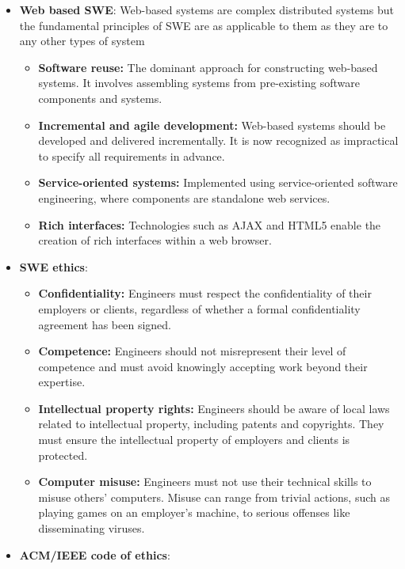 \documentclass{report}
\begin{document}
\begin{itemize}
        \item \textbf{Web based SWE}: Web-based systems are complex distributed systems but the fundamental principles of SWE are as applicable to them as they are to any other types of system
            \begin{itemize}[noitemsep]
                \item \textbf{Software reuse:} The dominant approach for constructing web-based systems. It involves assembling systems from pre-existing software components and systems.
                \item \textbf{Incremental and agile development:} Web-based systems should be developed and delivered incrementally. It is now recognized as impractical to specify all requirements in advance.
                \item \textbf{Service-oriented systems:} Implemented using service-oriented software engineering, where components are standalone web services.
                \item \textbf{Rich interfaces:} Technologies such as AJAX and HTML5 enable the creation of rich interfaces within a web browser.
            \end{itemize}
        \item \textbf{SWE ethics}:
            \begin{itemize}[noitemsep]
                \item \textbf{Confidentiality:} Engineers must respect the confidentiality of their employers or clients, regardless of whether a formal confidentiality agreement has been signed.
                \item \textbf{Competence:} Engineers should not misrepresent their level of competence and must avoid knowingly accepting work beyond their expertise.
                \item \textbf{Intellectual property rights:} Engineers should be aware of local laws related to intellectual property, including patents and copyrights. They must ensure the intellectual property of employers and clients is protected.
                \item \textbf{Computer misuse:} Engineers must not use their technical skills to misuse others' computers. Misuse can range from trivial actions, such as playing games on an employer’s machine, to serious offenses like disseminating viruses.
            \end{itemize}
        \item \textbf{ACM/IEEE code of ethics}:
            \begin{itemize}[noitemsep]

\end{itemize}
\end{itemize}
\end{document}
